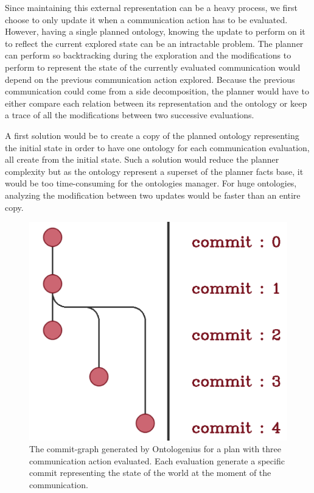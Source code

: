 Since maintaining this external representation can be a heavy process, we first choose to only update it when a communication action has to be evaluated. However, having a single planned ontology, knowing the update to perform on it to reflect the current explored state can be an intractable problem. The planner can perform so backtracking during the exploration and the modifications to perform to represent the state of the currently evaluated communication would depend on the previous communication action explored. Because the previous communication could come from a side decomposition, the planner would have to either compare each relation between its representation and the ontology or keep a trace of all the modifications between two successive evaluations.

A first solution would be to create a copy of the planned ontology representing the initial state in order to have one ontology for each communication evaluation, all create from the initial state. Such a solution would reduce the planner complexity but as the ontology represent a superset of the planner facts base, it would be too time-consuming for the ontologies manager. For huge ontologies, analyzing the modification between two updates would be faster than an entire copy.

\begin{figure}[!ht]
\centering
\includegraphics[scale=0.3]{figures/chapter5/versioning_simple.png}
\caption{\label{fig:chap5_versioning_simple} The commit-graph generated by Ontologenius for a plan with three communication action evaluated. Each evaluation generate a specific commit representing the state of the world at the moment of the communication. }
\end{figure}

